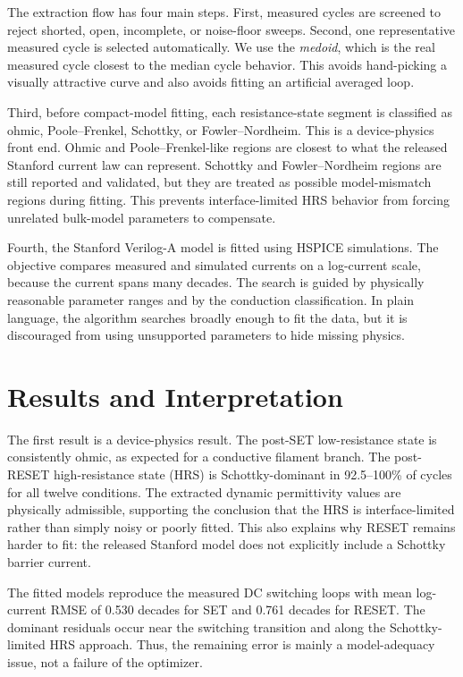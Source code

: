\documentclass[10pt,letterpaper]{article}
\begin{document}
The extraction flow has four main steps.  First, measured cycles are screened
to reject shorted, open, incomplete, or noise-floor sweeps.  Second, one
representative measured cycle is selected automatically.  We use the
\emph{medoid}, which is the real measured cycle closest to the median
cycle behavior.  This avoids hand-picking a visually attractive curve and also
avoids fitting an artificial averaged loop.

Third, before compact-model fitting, each resistance-state segment is
classified as ohmic, Poole--Frenkel, Schottky, or Fowler--Nordheim.  This is a
device-physics front end.  Ohmic and Poole--Frenkel-like regions are closest
to what the released Stanford current law can represent.  Schottky and
Fowler--Nordheim regions are still reported and validated, but they are
treated as possible model-mismatch regions during fitting.  This prevents
interface-limited HRS behavior from forcing unrelated bulk-model parameters
to compensate.

Fourth, the Stanford Verilog-A model is fitted using HSPICE simulations.  The
objective compares measured and simulated currents on a log-current scale,
because the current spans many decades.  The search is guided by physically
reasonable parameter ranges and by the conduction classification.  In plain
language, the algorithm searches broadly enough to fit the data, but it is
discouraged from using unsupported parameters to hide missing physics.

\newpage

\section*{Results and Interpretation}
The first result is a device-physics result.  The post-SET low-resistance
state is consistently ohmic, as expected for a conductive filament branch.
The post-RESET high-resistance state (HRS) is Schottky-dominant in
92.5--100\% of cycles for all twelve conditions.  The extracted dynamic
permittivity values are physically admissible, supporting the conclusion that
the HRS is interface-limited rather than simply noisy or poorly fitted.  This
also explains why RESET remains harder to fit: the released Stanford model
does not explicitly include a Schottky barrier current.

The fitted models reproduce the measured DC switching loops with mean
log-current RMSE of 0.530 decades for SET and 0.761 decades for RESET.  The
dominant residuals occur near the switching transition and along the
Schottky-limited HRS approach.  Thus, the remaining error is mainly a
model-adequacy issue, not a failure of the optimizer.
\end{document}
